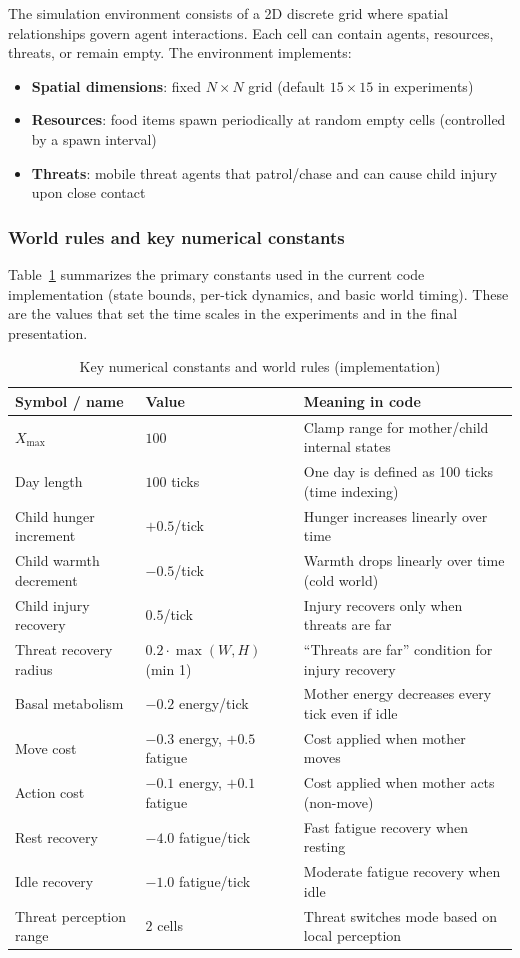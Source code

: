 The simulation environment consists of a 2D discrete grid where spatial relationships govern agent interactions. Each cell can contain agents, resources, threats, or remain empty. The environment implements:

\begin{itemize}
    \item \textbf{Spatial dimensions}: fixed $N \times N$ grid (default $15\times15$ in experiments)
    \item \textbf{Resources}: food items spawn periodically at random empty cells (controlled by a spawn interval)
    \item \textbf{Threats}: mobile threat agents that patrol/chase and can cause child injury upon close contact
\end{itemize}

\subsubsection{World rules and key numerical constants}
Table~\ref{tab:world_magic_numbers} summarizes the primary constants used in the current code implementation (state bounds, per-tick dynamics, and basic world timing). These are the values that set the time scales in the experiments and in the final presentation.

\begin{table}[H]
\centering
\caption{Key numerical constants and world rules (implementation)}
\label{tab:world_magic_numbers}
\renewcommand{\arraystretch}{1.08}
\begin{tabularx}{\linewidth}{@{} l l X @{}}
\toprule
Symbol / name & Value & Meaning in code \\
\midrule
$X_{\max}$ & $100$ & Clamp range for mother/child internal states \\
Day length & $100$ ticks & One day is defined as 100 ticks (time indexing) \\
Child hunger increment & $+0.5$/tick & Hunger increases linearly over time \\
Child warmth decrement & $-0.5$/tick & Warmth drops linearly over time (cold world) \\
Child injury recovery & $0.5$/tick & Injury recovers only when threats are far \\
Threat recovery radius & $0.2\cdot\max(W,H)$ (min 1) & ``Threats are far'' condition for injury recovery \\
Basal metabolism & $-0.2$ energy/tick & Mother energy decreases every tick even if idle \\
Move cost & $-0.3$ energy, $+0.5$ fatigue & Cost applied when mother moves \\
Action cost & $-0.1$ energy, $+0.1$ fatigue & Cost applied when mother acts (non-move) \\
Rest recovery & $-4.0$ fatigue/tick & Fast fatigue recovery when resting \\
Idle recovery & $-1.0$ fatigue/tick & Moderate fatigue recovery when idle \\
Threat perception range & $2$ cells & Threat switches mode based on local perception \\
\bottomrule
\end{tabularx}
\end{table}

